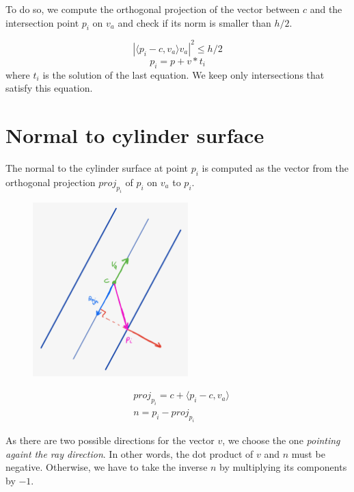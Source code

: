 \documentclass{article}
\begin{document}
To do so, we compute the orthogonal projection of the vector between $c$ and the intersection point $p_i$ on $v_a$ and check if its norm is smaller than $h/2$.

$$|\langle p_i-c, v_a\rangle v_a|^2 \leq h/2$$
$$p_i = p+v*t_i$$
where $t_i$ is the solution of the last equation. We keep only intersections that satisfy this equation.

\section{Normal to cylinder surface}

The normal to the cylinder surface at point $p_i$ is computed as the vector from the orthogonal projection $proj_{p_i}$ of $p_i$ on $v_a$ to $p_i$.

\begin{figure}
\includegraphics[width=6cm]{res/Normal_sketch.jpg}
\end{figure}

\begin{align*}
    &proj_{p_i} = c + \langle p_i-c, v_a \rangle \\
    &n = p_i - proj_{p_i}
\end{align*}

As there are two possible directions for the vector $v$, we choose the one \textit{pointing againt the ray direction}. In other words, the dot product of $v$ and $n$ must be negative. Otherwise, we have to take the inverse $n$ by multiplying its components by $-1$.
\end{document}
